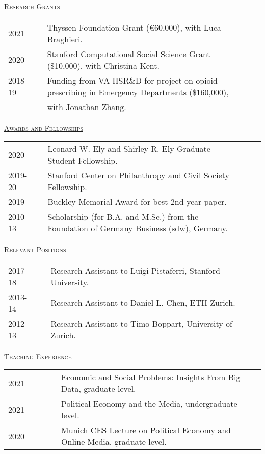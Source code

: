 \documentclass[letterpaper,11pt]{article}
\begin{document}
\newpage

\underline {\textsc{Research Grants}}

\begin{tabular}{@{}l@{}cl@{}cl}
2021 & & Thyssen Foundation Grant (\euro{}60,000), with Luca Braghieri. \\
2020 & & Stanford Computational Social Science Grant (\$10,000), with Christina Kent. \\
2018-19 & & Funding from VA HSR\&D for project on opioid prescribing in Emergency Departments (\$160,000), \\ & & with Jonathan Zhang.
\end{tabular}
 \bigskip
 
\underline {\textsc{Awards and Fellowships}}

\begin{tabular}{@{}l@{}cl@{}cl}
2020 & & Leonard W. Ely and Shirley R. Ely Graduate Student Fellowship. \\
2019-20 & & Stanford Center on Philanthropy and Civil Society Fellowship. \\
2019 & & Buckley Memorial Award for best 2nd year paper. \\
2010-13 & & Scholarship (for B.A. and M.Sc.) from the Foundation of Germany Business (sdw), Germany. \\

\end{tabular}
 \bigskip
 
\underline {\textsc{Relevant Positions}}

\begin{tabular}{@{}l@{}cl@{}cl}
2017-18 & & Research Assistant to Luigi Pistaferri, Stanford University. \\
2013-14 & & Research Assistant to Daniel L. Chen, ETH Zurich. \\
2012-13 & & Research Assistant to Timo Boppart, University of Zurich.
\end{tabular}

\bigskip
 
\underline {\textsc{Teaching Experience}}

\begin{tabular}{@{}l@{}cl@{}cl}
2021 & \ \ \ \ \ & Economic and Social Problems: Insights From Big Data, graduate level. \\
2021 & \ \ \ \ \ & Political Economy and the Media, undergraduate level. \\
2020 & \ \ \ \ \ & Munich CES Lecture on Political Economy and Online Media, graduate level. \\
\end{tabular}
\end{document}
